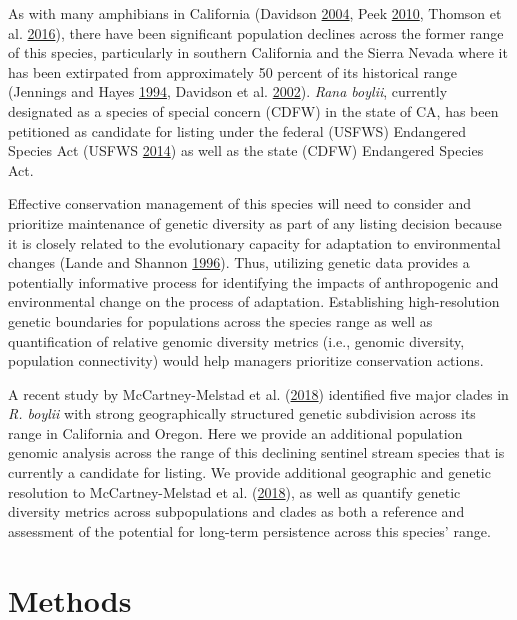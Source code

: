 \documentclass[proquest,12pt,final]{ucthesis-CA2012} %
\begin{document}
\begin{ucmainmatter}
As with many amphibians in California (Davidson
\protect\hyperlink{ref-davidson_declining_2004}{2004}, Peek
\protect\hyperlink{ref-peek_landscape_2010}{2010}, Thomson et al.
\protect\hyperlink{ref-thomson_california_2016}{2016}), there have been
significant population declines across the former range of this species,
particularly in southern California and the Sierra Nevada where it has
been extirpated from approximately 50 percent of its historical range
(Jennings and Hayes
\protect\hyperlink{ref-jennings_amphibian_1994}{1994}, Davidson et al.
\protect\hyperlink{ref-davidson_spatial_2002}{2002}). \emph{Rana
boylii}, currently designated as a species of special concern (CDFW) in
the state of CA, has been petitioned as candidate for listing under the
federal (USFWS) Endangered Species Act (USFWS
\protect\hyperlink{ref-usfws_endangered_2014}{2014}) as well as the
state (CDFW) Endangered Species Act.

Effective conservation management of this species will need to consider
and prioritize maintenance of genetic diversity as part of any listing
decision because it is closely related to the evolutionary capacity for
adaptation to environmental changes (Lande and Shannon
\protect\hyperlink{ref-lande_role_1996}{1996}). Thus, utilizing genetic
data provides a potentially informative process for identifying the
impacts of anthropogenic and environmental change on the process of
adaptation. Establishing high-resolution genetic boundaries for
populations across the species range as well as quantification of
relative genomic diversity metrics (i.e., genomic diversity, population
connectivity) would help managers prioritize conservation actions.

A recent study by McCartney-Melstad et al.
(\protect\hyperlink{ref-mccartney-melstad_population_2018}{2018})
identified five major clades in \emph{R. boylii} with strong
geographically structured genetic subdivision across its range in
California and Oregon. Here we provide an additional population genomic
analysis across the range of this declining sentinel stream species that
is currently a candidate for listing. We provide additional geographic
and genetic resolution to McCartney-Melstad et al.
(\protect\hyperlink{ref-mccartney-melstad_population_2018}{2018}), as
well as quantify genetic diversity metrics across subpopulations and
clades as both a reference and assessment of the potential for long-term
persistence across this species' range.

\hypertarget{methods-2}{%
\section{Methods}\label{methods-2}}


\end{ucmainmatter}
\end{document}
